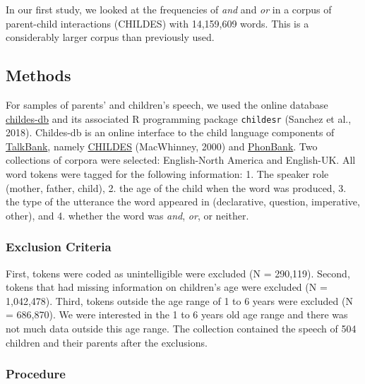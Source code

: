 \documentclass[,man,floatsintext]{apa6}
\begin{document}
In our first study, we looked at the frequencies of \emph{and} and \emph{or} in a corpus of parent-child interactions (CHILDES) with 14,159,609 words. This is a considerably larger corpus than previously used.

\hypertarget{methods}{%
\subsection{Methods}\label{methods}}

For samples of parents' and children's speech, we used the online database \href{childes-db.stanford.edu}{childes-db} and its associated R programming package \texttt{childesr} (Sanchez et al., 2018). Childes-db is an online interface to the child language components of \href{https://talkbank.org/}{TalkBank}, namely \href{https://childes.talkbank.org/}{CHILDES} (MacWhinney, 2000) and \href{https://phonbank.talkbank.org/}{PhonBank}. Two collections of corpora were selected: English-North America and English-UK. All word tokens were tagged for the following information: 1. The speaker role (mother, father, child), 2. the age of the child when the word was produced, 3. the type of the utterance the word appeared in (declarative, question, imperative, other), and 4. whether the word was \emph{and}, \emph{or}, or neither.

\hypertarget{exclusion-criteria}{%
\subsubsection{Exclusion Criteria}\label{exclusion-criteria}}

First, tokens were coded as unintelligible were excluded (N = 290,119). Second, tokens that had missing information on children's age were excluded (N = 1,042,478). Third, tokens outside the age range of 1 to 6 years were excluded (N = 686,870). We were interested in the 1 to 6 years old age range and there was not much data outside this age range. The collection contained the speech of 504 children and their parents after the exclusions.

\hypertarget{procedure}{%
\subsubsection{Procedure}\label{procedure}}
\end{document}
